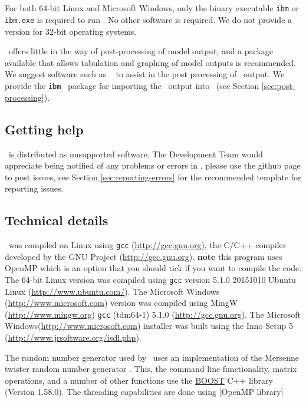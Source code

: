 \subsection{}

For both 64-bit Linux and Microsoft Windows, only the binary executable \texttt{ibm} or \texttt{ibm.exe} is required to run \IBM . No other software is required. We do not provide a version for 32-bit operating systems. 

\IBM\ offers little in the way of post-processing of model output, and a package available that allows tabulation and graphing of model outputs is recommended. We suggest software such as \href{http://www.r-project.org}{\R}\ \citep{R} to assist in the post processing of \IBM\ output. We provide the \texttt{ibm} \R\ package for importing the \IBM\ output into \R\ (see Section \ref{sec:post-processing}).

\subsection{Getting help}

\IBM\ is distributed as unsupported software. The Development Team would appreciate being notified of any problems or errors in \IBM , please use the github page to post issues, see Section \ref{sec:reporting-errors} for the recommended template for reporting issues.

\subsection{Technical details}\label{sec:tech}

\IBM\ was compiled on Linux using \texttt{gcc} (\url{http://gcc.gnu.org}), the C/C++ compiler developed by the GNU Project (\url{http://gcc.gnu.org}). \textbf{note} this program uses OpenMP which is an option that you should tick if you want to compile the code. The 64-bit Linux  version was compiled using \texttt{gcc} version 5.1.0 20151010 Ubuntu Linux (\url{http://www.ubuntu.com/}). The Microsoft Windows (\url{http://www.microsoft.com}) version was compiled using MingW (\url{http://www.mingw.org}) \texttt{gcc} (tdm64-1) 5.1.0 (\url{http://gcc.gnu.org}). The Microsoft Windows(\url{http://www.microsoft.com}) installer was built using the Inno Setup 5 (\url{http://www.jrsoftware.org/isdl.php}).

The random number generator used by \IBM\ uses an implementation of the Mersenne twister random number generator \citep{796}. This, the command line functionality, matrix operations, and a number of other functions use the \href{http://www.boost.org/}{BOOST} C++ library (Version 1.58.0). The threading capabilities are done using \href{https://www.openmp.org/}[OpenMP library]

